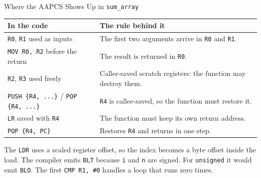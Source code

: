 \documentclass[9pt,aspectratio=169,xcolor=table]{beamer}
\begin{document}
\begin{frame}{Where the AAPCS Shows Up in \texttt{sum\_array}}
    \begin{center}
    {\small
    \striped
    \begin{tabular}{@{}l R{.62\textwidth}@{}}
        \toprule
        \textbf{In the code} & \textbf{The rule behind it} \\
        \midrule
        \texttt{R0}, \texttt{R1} used as inputs & The first two arguments arrive in \texttt{R0} and \texttt{R1}. \\
        \texttt{MOV R0, R2} before the return & The result is returned in \texttt{R0}. \\
        \texttt{R2}, \texttt{R3} used freely & Caller-saved scratch registers: the function may destroy them. \\
        \texttt{PUSH \{R4, ...\}} / \texttt{POP \{R4, ...\}} & \texttt{R4} is callee-saved, so the function must restore it. \\
        \texttt{LR} saved with \texttt{R4} & The function must keep its own return address. \\
        \texttt{POP \{R4, PC\}} & Restores \texttt{R4} and returns in one step. \\
        \bottomrule
    \end{tabular}}
    \end{center}

    \vspace{2mm}
    {\small The \texttt{LDR} uses a \alert{scaled register offset}, so the index becomes a byte offset inside the load. The compiler emits \texttt{BLT} because \texttt{i} and \texttt{n} are signed. For \texttt{unsigned} it would emit \texttt{BLO}. The first \texttt{CMP R1, \#0} handles a loop that runs zero times.}
\end{frame}
\end{document}
